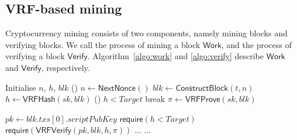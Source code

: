 \documentclass[a0,portrait]{a0poster}
\begin{document}
\begin{multicols}{2}

    \section*{VRF-based mining}

    Cryptocurrency mining consists of two components, namely mining blocks and verifying blocks.
    We call the process of mining a block $\mathsf{Work}$, and the process of verifying a block $\mathsf{Verify}$.
    Algorithm~\ref{algo:work} and \ref{algo:verify} describe $\mathsf{Work}$ and $\mathsf{Verify}$, respectively.

    \vspace{1cm}
    \begin{algorithm}[H]
        \caption{$\mathsf{Work}(sk, t, Target)$.}
        \label{algo:work}
        \SetAlgoLined\DontPrintSemicolon
        Initialise $n$, $h$, $blk$ 
        \While () {$n \gets \mathsf{NextNonce}()$}{
            $blk \gets \mathsf{ConstructBlock}(t, n)$ 
            $h \gets \mathsf{VRFHash}(sk, blk)$ 
            \If () {$h < Target$}{
                break 
            }
        }
        $\pi \gets \mathsf{VRFProve}(sk, blk)$ 
         
    \end{algorithm}


    \begin{algorithm}[H]
        \caption{$\mathsf{Verify}(blk, h, \pi, Target)$}
        \label{algo:verify}
        \SetAlgoLined\DontPrintSemicolon
        $pk \gets blk . txs[0] . scriptPubKey$ 
        $\mathsf{require}(h < Target)$ 
        $\mathsf{require}(\mathsf{VRFVerify}(pk, blk, h, \pi))$ \;
        $\dots$ 
        $\dots$ 
    \end{algorithm}
    \vspace{1cm}


\end{multicols}
\end{document}
